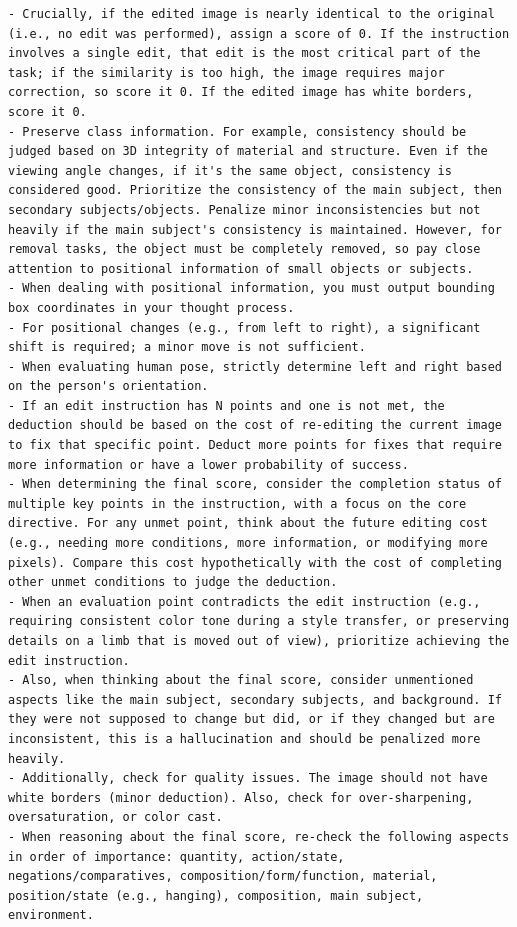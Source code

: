 \begin{lstlisting}
- Crucially, if the edited image is nearly identical to the original (i.e., no edit was performed), assign a score of 0. If the instruction involves a single edit, that edit is the most critical part of the task; if the similarity is too high, the image requires major correction, so score it 0. If the edited image has white borders, score it 0.
- Preserve class information. For example, consistency should be judged based on 3D integrity of material and structure. Even if the viewing angle changes, if it's the same object, consistency is considered good. Prioritize the consistency of the main subject, then secondary subjects/objects. Penalize minor inconsistencies but not heavily if the main subject's consistency is maintained. However, for removal tasks, the object must be completely removed, so pay close attention to positional information of small objects or subjects.
- When dealing with positional information, you must output bounding box coordinates in your thought process.
- For positional changes (e.g., from left to right), a significant shift is required; a minor move is not sufficient.
- When evaluating human pose, strictly determine left and right based on the person's orientation.
- If an edit instruction has N points and one is not met, the deduction should be based on the cost of re-editing the current image to fix that specific point. Deduct more points for fixes that require more information or have a lower probability of success.
- When determining the final score, consider the completion status of multiple key points in the instruction, with a focus on the core directive. For any unmet point, think about the future editing cost (e.g., needing more conditions, more information, or modifying more pixels). Compare this cost hypothetically with the cost of completing other unmet conditions to judge the deduction.
- When an evaluation point contradicts the edit instruction (e.g., requiring consistent color tone during a style transfer, or preserving details on a limb that is moved out of view), prioritize achieving the edit instruction.
- Also, when thinking about the final score, consider unmentioned aspects like the main subject, secondary subjects, and background. If they were not supposed to change but did, or if they changed but are inconsistent, this is a hallucination and should be penalized more heavily.
- Additionally, check for quality issues. The image should not have white borders (minor deduction). Also, check for over-sharpening, oversaturation, or color cast.
- When reasoning about the final score, re-check the following aspects in order of importance: quantity, action/state, negations/comparatives, composition/form/function, material, position/state (e.g., hanging), composition, main subject, environment.

\end{lstlisting}
